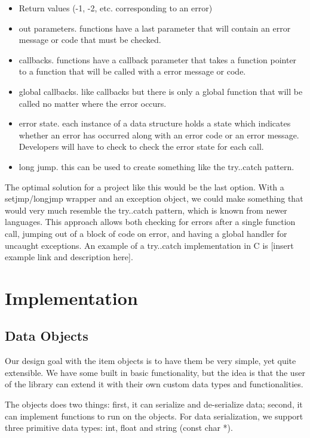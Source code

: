 \documentclass[table]{ituthesis}
\begin{document}
\begin{itemize}
	\item Return values (-1, -2, etc. corresponding to an error)
	\item out parameters. functions have a last parameter that will contain an error message or code that must be checked.
	\item callbacks. functions have a callback parameter that takes a function pointer to a function that will be called with a error message or code.
	\item global callbacks. like callbacks but there is only a global function that will be called no matter where the error occurs.
	\item error state. each instance of a data structure holds a state which indicates whether an error has occurred along with an error code or an error message. Developers will have to check to check the error state for each call.
	\item long jump. this can be used to create something like the try..catch pattern.
\end{itemize}

The optimal solution for a project like this would be the last option. With a setjmp/longjmp wrapper and an exception object, we could make something that would very much resemble the try..catch pattern, which is known from newer languages. This approach allows both checking for errors after a single function call, jumping out of a block of code on error, and having a global handler for uncaught exceptions. An example of a try..catch implementation in C is [insert example link and description here].

\chapter{Implementation}

\section{Data Objects}\label{sec:impl_data_objects}

Our design goal with the item objects is to have them be very simple, yet quite extensible. We have some built in basic functionality, but the idea is that the user of the library can extend it with their own custom data types and functionalities.

The objects does two things: first, it can serialize and de-serialize data; second, it can implement functions to run on the objects. For data serialization, we support three primitive data types: int, float and string (const char *).
\end{document}
